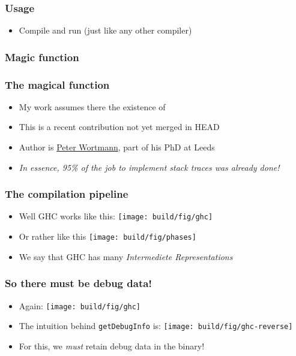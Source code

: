 \documentclass[11pt]{beamer} %
\begin{document}
  \begin{frame}
   \frametitle{Usage}
  \begin{itemize}
   \item Compile and run (just like any other compiler)
     \useGhcCode
  \end{itemize}
  \end{frame}

\subsubsection{Magic function}
  \begin{frame}
   \frametitle{The magical function}
  \begin{itemize}
   \item <1-> My work assumes there the existence of
     \getDebugInfoCode
   \item <2-> This is a recent contribution not yet merged in HEAD 
   \item <2-> Author is
     \href{http://www.personal.leeds.ac.uk/~scpmw/site.html}{Peter Wortmann},
     part of his PhD at Leeds
   \item <3-> \emph{In essence, 95\% of the job to implement stack traces was
       already done!}
  \end{itemize}
  \end{frame}

  \begin{frame}
   \frametitle{The compilation pipeline}
  \begin{itemize}
   \item <1-> Well GHC works like this:
     \texttt{[image: build/fig/ghc]}
   \item <2-> Or rather like this
     \texttt{[image: build/fig/phases]}
   \item <3-> We say that GHC has many \emph{Intermediete Representations}
  \end{itemize}
  \end{frame}

  \begin{frame}
   \frametitle{So there must be debug data!}
  \begin{itemize}
   \item <1-> Again:
     \texttt{[image: build/fig/ghc]}
   \item <2-> The intuition behind \texttt{getDebugInfo} is:
     \texttt{[image: build/fig/ghc-reverse]}
   \item <3-> For this, we \emph{must} retain debug data in the binary!
  \end{itemize}
  \end{frame}
\end{document}

